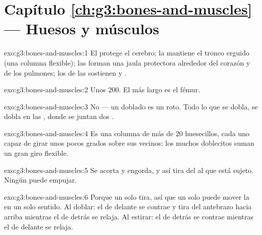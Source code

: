 \section*{Capítulo \ref{ch:g3:bones-and-muscles} --- Huesos y músculos}

\begin{solution}{exo:g3:bones-and-muscles:1}
El  protege el cerebro; la  mantiene el tronco
erguido (una columna flexible); las  forman una jaula
protectora alrededor del corazón y de los pulmones; los  de las
 sostienen  y .
\end{solution}

\begin{solution}{exo:g3:bones-and-muscles:2}
Unos $200$. El más largo es el fémur.
\end{solution}

\begin{solution}{exo:g3:bones-and-muscles:3}
No --- un  doblado es un  roto. Todo lo que se dobla, se
dobla en las , donde se juntan dos .
\end{solution}

\begin{solution}{exo:g3:bones-and-muscles:4}
Es una columna de más de $20$ huesecillos, cada uno capaz de girar
unos pocos grados sobre sus vecinos; los muchos doblecitos suman un
gran giro flexible.
\end{solution}

\begin{solution}{exo:g3:bones-and-muscles:5}
Se acorta y engorda, y así tira del  al que está sujeto. Ningún
 puede empujar.
\end{solution}

\begin{solution}{exo:g3:bones-and-muscles:6}
Porque un  solo tira, así que un solo  puede mover la
 en un solo sentido. Al doblar: el  de delante se
contrae y tira del antebrazo hacia arriba mientras el de detrás se
relaja. Al estirar: el de detrás se contrae mientras el de delante se
relaja.
\end{solution}

